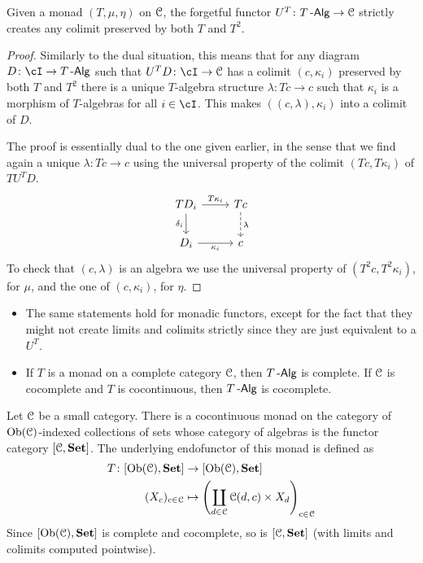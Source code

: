 \documentclass[a4paper,11pt,oneside,openany]{scrbook}
\begin{document}
\begin{prop}\label{create colims}
	Given a monad $(T,\mu,\eta)$ on $\operatorname{\mathcal{C}}$, the forgetful functor $U^T\colon T\operatorname{-\mathsf{Alg}}\rightarrow\operatorname{\mathcal{C}}$ strictly creates any colimit preserved by both $T$ and $T^2$.
\end{prop}

\begin{proof}
	Similarly to the dual situation, this means that for any diagram
    $D\colon\cI\rightarrow T\Alg$ such that $U^TD\colon\cI\rightarrow\C$ has a
    colimit $(c,\kappa_i)$ preserved by both $T$ and $T^2$ there is a unique
    $T$-algebra structure $\lambda\colon Tc\rightarrow c$ such that $\kappa_i$
    is a morphism of $T$-algebras for all $i\in\cI$. This makes
    $((c,\lambda),\kappa_i)$ into a colimit of $D$.

	The proof is essentially dual to the one given earlier, in the sense that we
	find again a unique $\lambda\colon Tc\rightarrow c$ using the universal
	property of the colimit $(Tc,T\kappa_i)$ of $TU^TD$.
	\[
		\begin{tikzcd}
			TD_i\ar[r, "T\kappa_i"]\ar[d, "\delta_i"']
			& Tc\ar[d, dashed, "\lambda"] \\
			D_i\ar[r, "\kappa_i"']
			& c
		\end{tikzcd}
	\]
	To check that $(c,\lambda)$ is an algebra we use the universal property of $(T^2c,T^2\kappa_i)$, for $\mu$, and the one of $(c,\kappa_i)$, for $\eta$.
\end{proof}

\begin{rmk}
    \begin{itemize}
        \item The same statements hold for monadic functors, except for the fact that they might not create limits and colimits strictly since they are just equivalent to a $U^T$.
        \item If $T$ is a monad on a complete category $\operatorname{\mathcal{C}}$, then $T\operatorname{-\mathsf{Alg}}$ is complete. If $\operatorname{\mathcal{C}}$ is cocomplete and $T$ is cocontinuous, then $T\operatorname{-\mathsf{Alg}}$ is cocomplete.
    \end{itemize}
\end{rmk}

\begin{exmp}
	Let $\operatorname{\mathcal{C}}$ be a small category. There is a cocontinuous monad on the category of $\operatorname{Ob}(\operatorname{\mathcal{C}})$-indexed collections of sets whose category of algebras is the functor category $[\operatorname{\mathcal{C}},{\normalfont\textbf{Set}}]$. The underlying endofunctor of this monad is defined as
	\begin{align*}
		T\colon[\operatorname{Ob}(\operatorname{\mathcal{C}}),{\normalfont\textbf{Set}}] & \to[\operatorname{Ob}(\operatorname{\mathcal{C}}),{\normalfont\textbf{Set}}]                                               \\
		(X_c)_{c\in\operatorname{\mathcal{C}}}        & \mapsto \left(\coprod_{d\in\operatorname{\mathcal{C}}}\operatorname{\mathcal{C}}(d,c)\times X_d\right)_{c\in\operatorname{\mathcal{C}}}
	\end{align*}
	Since $[\operatorname{Ob}(\operatorname{\mathcal{C}}),{\normalfont\textbf{Set}}]$ is complete and cocomplete, so is $[\operatorname{\mathcal{C}},{\normalfont\textbf{Set}}]$ (with limits and colimits computed pointwise).
\end{exmp}
\end{document}
